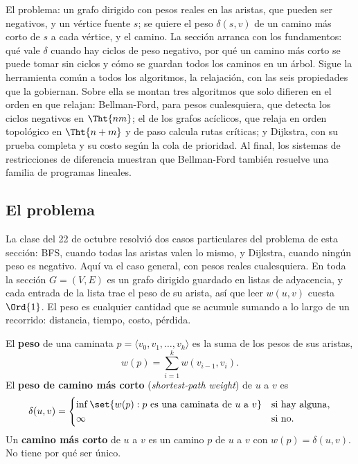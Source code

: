 \documentclass[11pt,letterpaper]{article}
\begin{document}
\begin{quick_sum}
  El problema: un grafo dirigido con pesos reales en las aristas, que
  pueden ser negativos, y un vértice fuente $s$; se quiere el peso
  $\delta(s, v)$ de un camino más corto de $s$ a cada vértice, y el
  camino. La sección arranca con los fundamentos: qué vale $\delta$
  cuando hay ciclos de peso negativo, por qué un camino más corto se
  puede tomar sin ciclos y cómo se guardan todos los caminos en un
  árbol. Sigue la herramienta común a todos los algoritmos, la
  relajación, con las seis propiedades que la gobiernan. Sobre ella se
  montan tres algoritmos que solo difieren en el orden en que relajan:
  Bellman-Ford, para pesos cualesquiera, que detecta los ciclos
  negativos en $\Tht{nm}$; el de los grafos acíclicos, que relaja en
  orden topológico en $\Tht{n + m}$ y de paso calcula rutas críticas;
  y Dijkstra, con su prueba completa y su costo según la cola de
  prioridad. Al final, los sistemas de restricciones de diferencia
  muestran que Bellman-Ford también resuelve una familia de programas
  lineales.
\end{quick_sum}


\subsection*{El problema}

La clase del 22 de octubre resolvió dos casos particulares del
problema de esta sección: BFS, cuando todas las aristas valen lo
mismo, y Dijkstra, cuando ningún peso es negativo. Aquí va el caso
general, con pesos reales cualesquiera. En toda la sección
$G = (V, E)$ es un grafo dirigido guardado en listas de adyacencia, y
cada entrada de la lista trae el peso de su arista, así que leer
$w(u, v)$ cuesta $\Ord{1}$. El peso es cualquier cantidad que se
acumule sumando a lo largo de un recorrido: distancia, tiempo, costo,
pérdida.

\begin{definicion}
  \label{def:distancia-fuente}
  El \textbf{peso} de una caminata
  $p = \langle v_0, v_1, \dots, v_k \rangle$ es la suma de los pesos
  de sus aristas,
  \[
    w(p) = \sum_{i=1}^{k} w(v_{i-1}, v_i) .
  \]
  El \textbf{peso de camino más corto} (\textit{shortest-path
  weight}) de $u$ a $v$ es
  \[
    \delta(u, v) =
    \begin{cases}
      \inf \set{w(p) : p \text{ es una caminata de } u
        \text{ a } v} & \text{si hay alguna,} \\
      \infty & \text{si no.}
    \end{cases}
  \]
  Un \textbf{camino más corto} de $u$ a $v$ es un camino $p$ de $u$ a
  $v$ con $w(p) = \delta(u, v)$. No tiene por qué ser único.
\end{definicion}
\end{document}
